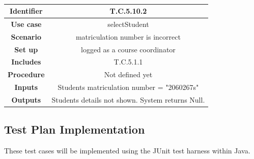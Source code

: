 \documentclass{l3deliverable}
\begin{document}
\\
\begin{tabular}{|c|c|}
\hline \textbf{Identifier} & T.C.5.10.2\\
\hline \textbf{Use case} & selectStudent\\
\hline \textbf{Scenario} & matriculation number is incorrect\\
\hline \textbf{Set up} & logged as a course coordinator\\
\hline \textbf{Includes} & T.C.5.1.1\\
\hline \textbf{Procedure} & Not defined yet\\
\hline \textbf{Inputs} & Students matriculation number = "2060267s"\\
\hline \textbf{Outputs} & Students details not shown. System returns Null.\\
\hline
\end{tabular}

\subsection{Test Plan Implementation}

These test cases will be implemented using the JUnit test harness within Java. 
\end{document}
